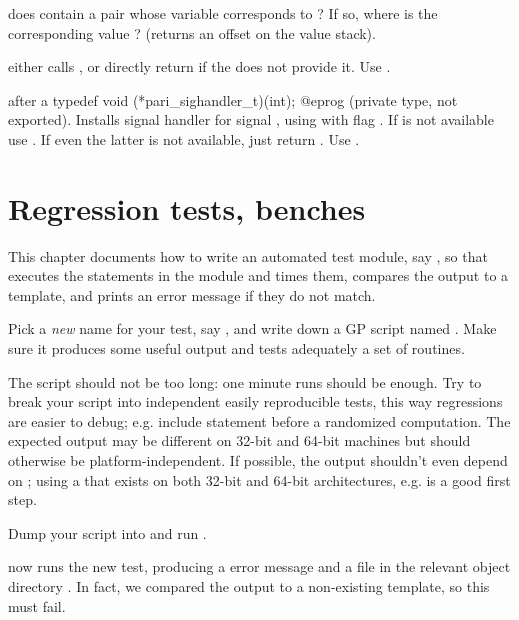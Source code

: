  does  contain
a pair whose variable corresponds to  ? If so, where is the
corresponding value ? (returns an offset on the value stack).


 either calls , or directly
return  if the  does not provide it. Use .

 after a
\bprog
  typedef void (*pari_sighandler_t)(int);
@eprog\noindent
(private type, not exported). Installs signal handler  for
signal , using  with flag . If
 is not available use . If even the latter is not
available, just return . Use .

\chapter{Regression tests, benches}

This chapter documents how to write an automated test module, say ,
so that  executes the statements in the  module
and times them, compares the output to a template, and prints an error
message if they do not match.

\item Pick a \emph{new} name for your test, say , and write down a
GP script named . Make sure it produces some useful output and tests
adequately a set of routines.

\item The script should not be too long: one minute runs should be enough.
Try to break your script into independent easily reproducible tests, this way
regressions are easier to debug; e.g. include  statement before
a randomized computation. The expected output may be different on 32-bit and
64-bit machines but should otherwise be platform-independent. If possible, the
output shouldn't even depend on ; using a 
that exists on both 32-bit and 64-bit architectures, e.g.  is a
good first step.

\item Dump your script into  and run .

\item {} now runs the new test, producing a \kbd{[BUG]} error
message and a  file in the relevant object directory .
In fact, we compared the output to a non-existing template, so this must fail.


